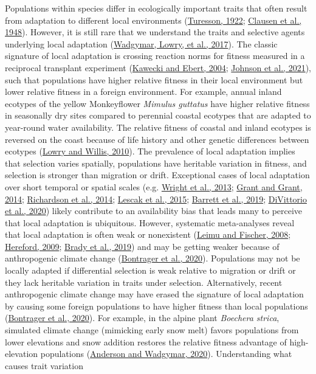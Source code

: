 \documentclass[
  12pt,
]{article}
\begin{document}
Populations within species differ in ecologically important traits that often result from adaptation to different local environments (\protect\hyperlink{ref-turesson_genotypic_1922}{Turesson, 1922}; \protect\hyperlink{ref-clausen_experimental_1948}{Clausen et al., 1948}). However, it is still rare that we understand the traits and selective agents underlying local adaptation (\protect\hyperlink{ref-wadgymar_identifying_2017}{Wadgymar, Lowry, et al., 2017}). The classic signature of local adaptation is crossing reaction norms for fitness measured in a reciprocal transplant experiment (\protect\hyperlink{ref-kawecki_conceptual_2004}{Kawecki and Ebert, 2004}; \protect\hyperlink{ref-johnson_reciprocal_2021}{Johnson et al., 2021}), such that populations have higher relative fitness in their local environment but lower relative fitness in a foreign environment. For example, annual inland ecotypes of the yellow Monkeyflower \emph{Mimulus guttatus} have higher relative fitness in seasonally dry sites compared to perennial coastal ecotypes that are adapted to year-round water availability. The relative fitness of coastal and inland ecotypes is reversed on the coast because of life history and other genetic differences between ecotypes (\protect\hyperlink{ref-lowry_widespread_2010}{Lowry and Willis, 2010}). The prevalence of local adaptation implies that selection varies spatially, populations have heritable variation in fitness, and selection is stronger than migration or drift. Exceptional cases of local adaptation over short temporal or spatial scales (e.g. \protect\hyperlink{ref-wright_indirect_2013}{Wright et al., 2013}; \protect\hyperlink{ref-grant_40_2014}{Grant and Grant, 2014}; \protect\hyperlink{ref-richardson_microgeographic_2014}{Richardson et al., 2014}; \protect\hyperlink{ref-lescak_evolution_2015}{Lescak et al., 2015}; \protect\hyperlink{ref-barrett_linking_2019}{Barrett et al., 2019}; \protect\hyperlink{ref-divittorio_natural_2020}{DiVittorio et al., 2020}) likely contribute to an availability bias that leads many to perceive that local adaptation is ubiquitous. However, systematic meta-analyses reveal that local adaptation is often weak or nonexistent (\protect\hyperlink{ref-leimu_meta-analysis_2008}{Leimu and Fischer, 2008}; \protect\hyperlink{ref-hereford_quantitative_2009}{Hereford, 2009}; \protect\hyperlink{ref-brady_understanding_2019}{Brady et al., 2019}) and may be getting weaker because of anthropogenic climate change (\protect\hyperlink{ref-bontrager_climate_2020}{Bontrager et al., 2020}). Populations may not be locally adapted if differential selection is weak relative to migration or drift or they lack heritable variation in traits under selection. Alternatively, recent anthropogenic climate change may have erased the signature of local adaptation by causing some foreign populations to have higher fitness than local populations (\protect\hyperlink{ref-bontrager_climate_2020}{Bontrager et al., 2020}). For example, in the alpine plant \emph{Boechera strica}, simulated climate change (mimicking early snow melt) favors populations from lower elevations and snow addition restores the relative fitness advantage of high-elevation populations (\protect\hyperlink{ref-anderson_climate_2020}{Anderson and Wadgymar, 2020}). Understanding what causes trait variation 
\end{document}
